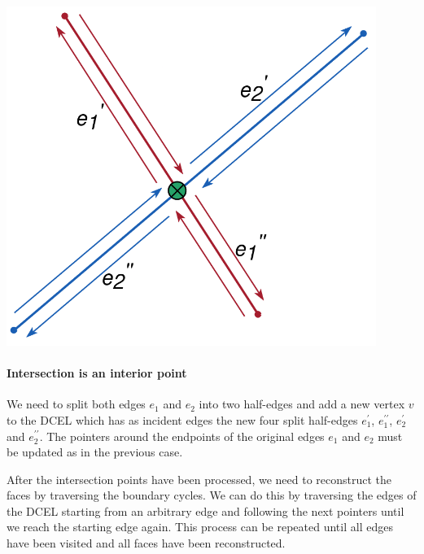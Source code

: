 \begin{minipage}{0.3\textwidth}
    \centering
    \includegraphics[width=0.9\textwidth]{images/int2.png}
\end{minipage}\hfill
\begin{minipage}{0.7\textwidth}
    \paragraph*{Intersection is an interior point}
    We need to split both edges $e_1$ and $e_2$ into two half-edges and add a new vertex $v$ to the DCEL which has as incident edges the new four split half-edges $e_1^{\prime}$, $e_1^{\prime\prime}$, $e_2^{\prime}$ and $e_2^{\prime\prime}$. The pointers around the endpoints of the original edges $e_1$ and $e_2$ must be updated as in the previous case.
\end{minipage}
\break

After the intersection points have been processed, we need to reconstruct the faces by traversing the boundary cycles. We can do this by traversing the edges of the DCEL starting from an arbitrary edge and following the next pointers until we reach the starting edge again. This process can be repeated until all edges have been visited and all faces have been reconstructed.

